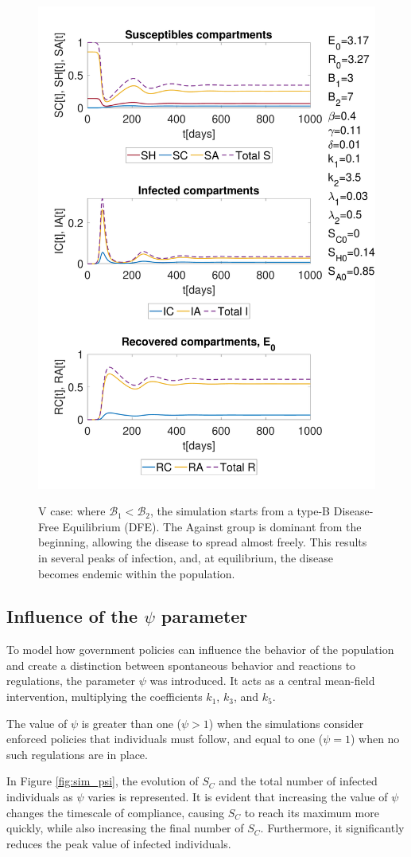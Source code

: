 \begin{figure}[ht]
	\centering
	{\includegraphics[width=0.5\linewidth]{1_corpo/figure/behav_epi_sim/E_0_model_3epi_behav_sim_B2_mag_B1}} 
	\caption[Full model simulation figure third]{V case: where \( \mathcal{B}_1 < \mathcal{B}_2 \), the simulation starts from a type-B Disease-Free Equilibrium (DFE). The Against group is dominant from the beginning, allowing the disease to spread almost freely. This results in several peaks of infection, and, at equilibrium, the disease becomes endemic within the population.}
	\label{fig:sim_B1_less_B2}
\end{figure}









\subsection{Influence of the $\psi$ parameter}
To model how government policies can influence the behavior of the population and create a distinction between spontaneous behavior and reactions to regulations, the parameter $\psi$ was introduced. It acts as a central mean-field intervention, multiplying the coefficients $k_1$, $k_3$, and $k_5$.

The value of $\psi$ is greater than one ($\psi > 1$) when the simulations consider enforced policies that individuals must follow, and equal to one ($\psi = 1$) when no such regulations are in place.

In Figure \ref{fig:sim_psi}, the evolution of $S_C$ and the total number of infected individuals as $\psi$ varies is represented. It is evident that increasing the value of $\psi$ changes the timescale of compliance, causing $S_C$ to reach its maximum more quickly, while also increasing the final number of $S_C$. Furthermore, it significantly reduces the peak value of infected individuals.

